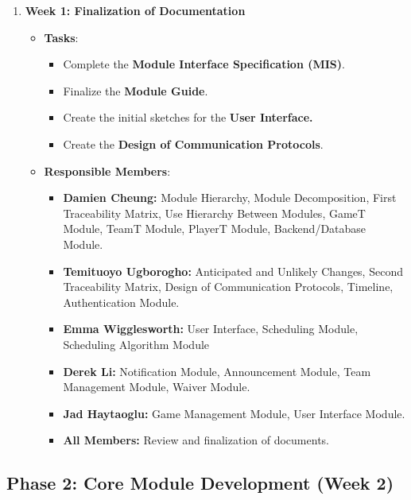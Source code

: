 \documentclass[12pt, titlepage]{article}
\begin{document}
\begin{enumerate}
    \item \textbf{Week 1: Finalization of Documentation}
    \begin{itemize}
        \item \textbf{Tasks}:
        \begin{itemize}
            \item Complete the \textbf{Module Interface Specification (MIS)}.
            \item Finalize the \textbf{Module Guide}.
            \item Create the initial sketches for the \textbf{User Interface.}
            \item Create the \textbf{Design of Communication Protocols}.
        \end{itemize}
        \item \textbf{Responsible Members}:
        \begin{itemize}
            \item \textbf{Damien Cheung:} Module Hierarchy, Module Decomposition, First Traceability Matrix, Use Hierarchy Between Modules,
            GameT Module, TeamT Module, PlayerT Module, Backend/Database Module.
            \item \textbf{Temituoyo Ugborogho:} Anticipated and Unlikely Changes, Second Traceability Matrix, Design of Communication Protocols,
            Timeline, Authentication Module.
            \item \textbf{Emma Wigglesworth:} User Interface, Scheduling Module, Scheduling Algorithm Module
            \item \textbf{Derek Li:} Notification Module, Announcement Module, Team Management Module, Waiver Module.
            \item \textbf{Jad Haytaoglu:} Game Management Module, User Interface Module.
            \item \textbf{All Members:} Review and finalization of documents.
        \end{itemize}
    \end{itemize}
\end{enumerate}

\subsection*{Phase 2: Core Module Development (Week 2)}
\end{document}
